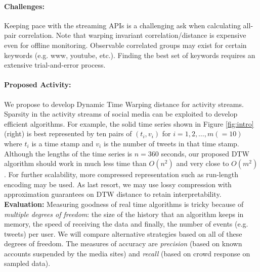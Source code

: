 \paragraph{Challenges:}

Keeping pace with the streaming APIs is a challenging ask when calculating all-pair correlation. Note that warping invariant correlation/distance is expensive even for offline monitoring. Observable correlated groups may exist for certain keywords (e.g. www, youtube, etc.). Finding the best set of keywords requires an extensive trial-and-error process.

\paragraph{Proposed Activity:}
We propose to develop Dynamic Time Warping distance for activity streams. Sparsity in the activity streams of social media can be exploited to develop efficient algorithms. For example, the solid time series shown in Figure \ref{fig:intro}(right) is best represented by ten pairs of $(t_i,v_i)$ for $i=1,2,\ldots,m(=10)$ where $t_i$ is a time stamp and $v_i$ is the number of tweets in that time stamp. Although the lengths of the time series is $n=360$ seconds, our proposed DTW algorithm should work in much less time than $O(n^2)$ and very close to $O(m^2)$. For further scalability, more compressed representation such as run-length encoding may be used. As last resort, we may use lossy compression with approximation guarantees on DTW distance to retain interpretability.
\textbf{Evaluation:} Measuring goodness of real time algorithms is tricky because of {\it multiple degrees of freedom}: the size of the history that an algorithm keeps in memory, the speed of receiving the data and finally, the number of events (e.g. tweets) per user. We will compare alternative strategies based on all of these degrees of freedom. The measures of accuracy are {\it precision} (based on known accounts suspended by the media sites) and {\it recall} (based on crowd response on sampled data).

\subsection{\Tonetwo}


